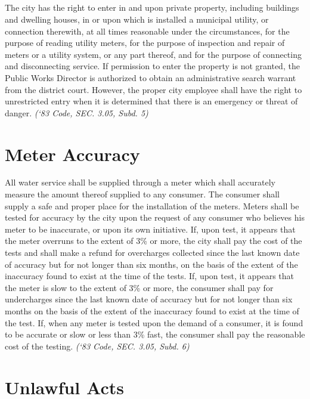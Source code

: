 \documentclass[code.tex]{subfiles}
\begin{document}
\subsection{}
The city has the right to enter in and upon private property, including buildings and dwelling houses, in or upon which is installed a municipal utility, or connection therewith, at all times reasonable under the circumstances, for the purpose of reading utility meters, for the purpose of inspection and repair of meters or a utility system, or any part thereof, and for the purpose of connecting and disconnecting service.  If permission to enter the property is not granted, the Public Works Director is authorized to obtain an administrative search warrant from the district court.  However, the proper city employee shall have the right to unrestricted entry when it is determined that there is an emergency or threat of danger.\newline
\emph{(‘83 Code, SEC. 3.05, Subd. 5)}
\section{Meter Accuracy}
All water service shall be supplied through a meter which shall accurately measure the amount thereof supplied to any consumer. The consumer shall supply a safe and proper place for the installation of the meters. Meters shall be tested for accuracy by the city upon the request of any consumer who believes his meter to be inaccurate, or upon its own initiative.  If, upon test, it appears that the meter overruns to the extent of 3\% or more, the city shall pay the cost of the tests and shall make a refund for overcharges collected since the last known date of accuracy but for not longer than six months, on the basis of the extent of the inaccuracy found to exist at the time of the tests.  If, upon test, it appears that the meter is slow to the extent of 3\% or more, the consumer shall pay for undercharges since the last known date of accuracy but for not longer than six months on the basis of the extent of the inaccuracy found to exist at the time of the test.  If, when any meter is tested upon the demand of a consumer, it is found to be accurate or slow or less than 3\% fast, the consumer shall pay the reasonable cost of the testing.\newline
\emph{(‘83 Code, SEC. 3.05, Subd. 6)}
\section{Unlawful Acts}
\end{document}
